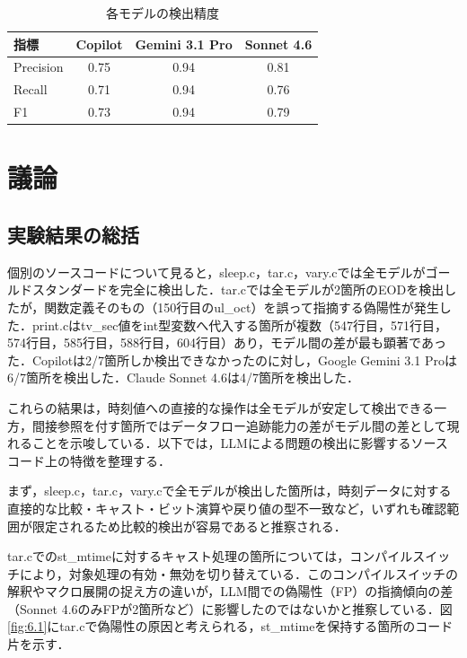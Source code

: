 \documentclass[submit,techrep,noauthor]{ipsj}
\begin{document}
\begin{table}[bt]
	\centering
	\caption{各モデルの検出精度}
	\label{tab:5.2}
	\begin{tabular}{|l|c|c|c|}
\hline
\textbf{指標} & \textbf{Copilot} & \textbf{Gemini 3.1 Pro} & \textbf{Sonnet 4.6} \\
\hline
Precision & 0.75 & 0.94 & 0.81 \\
\hline
Recall    & 0.71 & 0.94 & 0.76 \\
\hline
F1        & 0.73 & 0.94 & 0.79 \\
\hline
\end{tabular}
\end{table}

\section{議論}

\subsection{実験結果の総括}

個別のソースコードについて見ると，sleep.c，tar.c，vary.cでは全モデルがゴールドスタンダードを完全に検出した．tar.cでは全モデルが2箇所のEODを検出したが，関数定義そのもの（150行目のul\_oct）を誤って指摘する偽陽性が発生した．print.cはtv\_sec値をint型変数へ代入する箇所が複数（547行目，571行目，574行目，585行目，588行目，604行目）あり，モデル間の差が最も顕著であった．Copilotは2/7箇所しか検出できなかったのに対し，Google Gemini 3.1 Proは6/7箇所を検出した．Claude Sonnet 4.6は4/7箇所を検出した．

これらの結果は，時刻値への直接的な操作は全モデルが安定して検出できる一方，間接参照を付す箇所ではデータフロー追跡能力の差がモデル間の差として現れることを示唆している．以下では，LLMによる問題の検出に影響するソースコード上の特徴を整理する．

まず，sleep.c，tar.c，vary.cで全モデルが検出した箇所は，時刻データに対する直接的な比較・キャスト・ビット演算や戻り値の型不一致など，いずれも確認範囲が限定されるため比較的検出が容易であると推察される．

tar.cでのst\_mtimeに対するキャスト処理の箇所については，コンパイルスイッチにより，対象処理の有効・無効を切り替えている．このコンパイルスイッチの解釈やマクロ展開の捉え方の違いが，LLM間での偽陽性（FP）の指摘傾向の差（Sonnet 4.6のみFPが2箇所など）に影響したのではないかと推察している．図\ref{fig:6.1}にtar.cで偽陽性の原因と考えられる，st\_mtimeを保持する箇所のコード片を示す．
\end{document}
